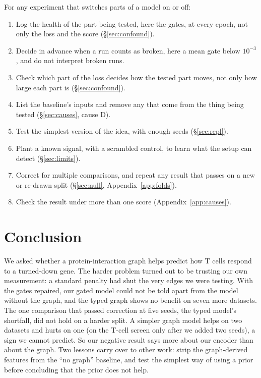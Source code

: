 \documentclass{article}
\begin{document}
For any experiment that switches parts of a model on or off:
\begin{enumerate}
\setlength{\itemsep}{0pt}
\item Log the health of the part being tested, here the gates, at every epoch, not only the loss and the
score (\S\ref{sec:confound}).
\item Decide in advance when a run counts as broken, here a mean gate below $10^{-3}$, and do not interpret
broken runs.
\item Check which part of the loss decides how the tested part moves, not only how large each part is
(\S\ref{sec:confound}).
\item List the baseline's inputs and remove any that come from the thing being tested (\S\ref{sec:causes},
cause D).
\item Test the simplest version of the idea, with enough seeds (\S\ref{sec:repl}).
\item Plant a known signal, with a scrambled control, to learn what the setup can detect
(\S\ref{sec:limits}).
\item Correct for multiple comparisons, and repeat any result that passes on a new or re-drawn split
(\S\ref{sec:null}, Appendix~\ref{app:folds}).
\item Check the result under more than one score (Appendix~\ref{app:causes}).
\end{enumerate}

\section{Conclusion}

We asked whether a protein-interaction graph helps predict how T cells respond to a turned-down gene. The
harder problem turned out to be trusting our own measurement: a standard penalty had shut the very edges
we were testing. With the gates repaired, our gated model could not be told apart from the model without
the graph, and the typed graph shows no benefit on seven more datasets. The one comparison that passed
correction at five seeds, the typed model's shortfall, did not hold on a harder split. A simpler graph
model helps on two datasets and hurts on one (on the T-cell screen only after we added two seeds), a sign
we cannot predict. So
our negative result says more about our encoder than about the graph. Two lessons carry over to other
work: strip the graph-derived features from the ``no graph'' baseline, and test the simplest way of using
a prior before concluding that the prior does not help.
\end{document}
